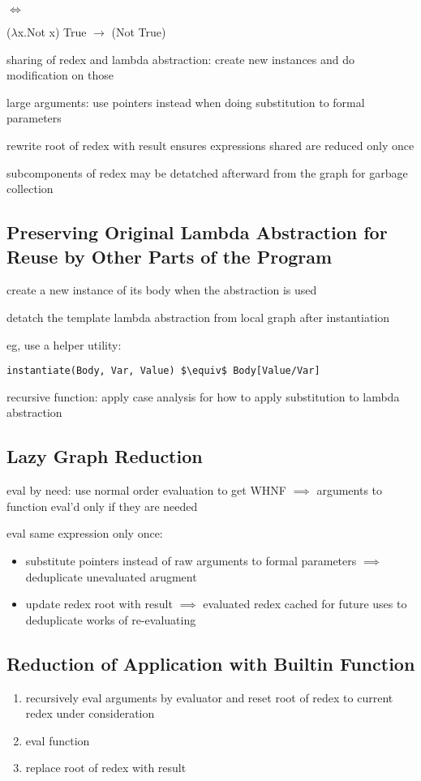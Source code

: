 \documentclass[8pt]{extarticle}
\begin{document}
\begin{multicols*}{2}
$\iff$

($\lambda$x.Not x) True $\rightarrow$ (Not True)

sharing of redex and lambda abstraction: create new instances and do modification on those

large arguments: use pointers instead when doing substitution to formal parameters

rewrite root of redex with result ensures expressions shared are reduced only once

subcomponents of redex may be detatched afterward from the graph for garbage collection

\subsection{Preserving Original Lambda Abstraction for Reuse by Other Parts of the Program}
create a new instance of its body when the abstraction is used

detatch the template lambda abstraction from local graph after instantiation

eg, use a helper utility:
\begin{lstlisting}
instantiate(Body, Var, Value) $\equiv$ Body[Value/Var]
\end{lstlisting}

recursive function: apply case analysis for how to apply substitution to lambda abstraction

\subsection{Lazy Graph Reduction}
eval by need: use normal order evaluation to get WHNF $\implies$ arguments to function eval'd only if they are needed

eval same expression only once:
\begin{itemize}
\item substitute pointers instead of raw arguments to formal parameters $\implies$ deduplicate unevaluated arugment
\item update redex root with result $\implies$ evaluated redex cached for future uses to deduplicate works of re-evaluating
\end{itemize}

\subsection{Reduction of Application with Builtin Function}
\begin{enumerate}
\item recursively eval arguments by evaluator and reset root of redex to current redex under consideration
\item eval function
\item replace root of redex with result
\end{enumerate}


\end{multicols*}
\end{document}
